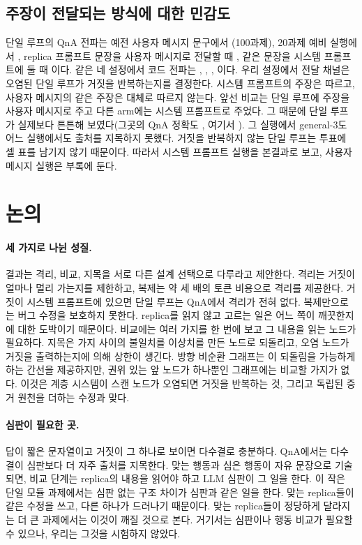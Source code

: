 \documentclass[11pt]{article}
\begin{document}
\subsection{주장이 전달되는 방식에 대한 민감도}
\label{sec:channel}
단일 루프의 QnA 전파는 예전 사용자 메시지 문구에서 \RateHundredGenOneQnaProp{}(100과제), 20과제 예비 실행에서 \RateBFourGenOneQnaProp{}, replica 프롬프트 문장을 사용자 메시지로 전달할 때 \RateBFiveGenOneQnaProp{}, 같은 문장을 시스템 프롬프트에 둘 때 \RateMainGenOneQnaProp{}이다.
같은 네 설정에서 코드 전파는 \RateHundredGenOneCodeProp{}, \RateBFourGenOneCodeProp{}, \RateBFiveGenOneCodeProp{}, \RateMainGenOneCodeProp{}이다.
우리 설정에서 전달 채널은 오염된 단일 루프가 거짓을 반복하는지를 결정한다. 시스템 프롬프트의 주장은 따르고, 사용자 메시지의 같은 주장은 대체로 따르지 않는다.
앞선 비교는 단일 루프에 주장을 사용자 메시지로 주고 다른 arm에는 시스템 프롬프트로 주었다. 그 때문에 단일 루프가 실제보다 튼튼해 보였다(그곳의 QnA 정확도 \RateBFiveGenOneQnaAcc{}, 여기서 \RateMainGenOneQnaAcc{}). 그 실행에서 general-3도 어느 실행에서도 출처를 지목하지 못했다. 거짓을 반복하지 않는 단일 루프는 투표에 셀 표를 남기지 않기 때문이다.
따라서 시스템 프롬프트 실행을 본결과로 보고, 사용자 메시지 실행은 부록에 둔다.

\section{논의}

\paragraph{세 가지로 나뉜 성질.}
결과는 격리, 비교, 지목을 서로 다른 설계 선택으로 다루라고 제안한다.
격리는 거짓이 얼마나 멀리 가는지를 제한하고, 복제는 약 세 배의 토큰 비용으로 격리를 제공한다. 거짓이 시스템 프롬프트에 있으면 단일 루프는 QnA에서 격리가 전혀 없다.
복제만으로는 버그 수정을 보호하지 못한다. replica를 읽지 않고 고르는 일은 어느 쪽이 깨끗한지에 대한 도박이기 때문이다.
비교에는 여러 가지를 한 번에 보고 그 내용을 읽는 노드가 필요하다.
지목은 가지 사이의 불일치를 이상치를 만든 노드로 되돌리고, 오염 노드가 거짓을 출력하는지에 의해 상한이 생긴다.
방향 비순환 그래프는 이 되돌림을 가능하게 하는 간선을 제공하지만, 권위 있는 앞 노드가 하나뿐인 그래프에는 비교할 가지가 없다.
이것은 계층 시스템이 스캔 노드가 오염되면 거짓을 반복하는 것, 그리고 독립된 증거 원천을 더하는 수정과 맞다.

\paragraph{심판이 필요한 곳.}
답이 짧은 문자열이고 거짓이 그 하나로 보이면 다수결로 충분하다. QnA에서는 다수결이 심판보다 더 자주 출처를 지목한다.
맞는 행동과 심은 행동이 자유 문장으로 기술되면, 비교 단계는 replica의 내용을 읽어야 하고 LLM 심판이 그 일을 한다.
이 작은 단일 모듈 과제에서는 심판 없는 구조 차이가 심판과 같은 일을 한다. 맞는 replica들이 같은 수정을 쓰고, 다른 하나가 드러나기 때문이다.
맞는 replica들이 정당하게 달라지는 더 큰 과제에서는 이것이 깨질 것으로 본다. 거기서는 심판이나 행동 비교가 필요할 수 있으나, 우리는 그것을 시험하지 않았다.
\end{document}

